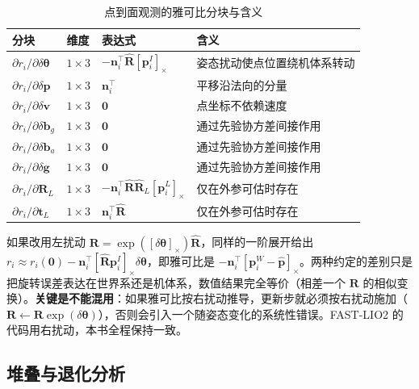 \begin{table}[htbp]
  \centering
  \caption{点到面观测的雅可比分块与含义}\label{tab:17-jacobian}
  \small
  \begin{tabular}{llll}
    \toprule
    分块 & 维度 & 表达式 & 含义 \\
    \midrule
    $\partial r_i/\partial\delta\bm{\theta}$ & $1\times3$ & $-\bm{n}_i^{\top}\hat{\bm{R}}[\bm{p}_i^{I}]_\times$ & 姿态扰动使点位置绕机体系转动 \\
    $\partial r_i/\partial\delta\bm{p}$ & $1\times3$ & $\bm{n}_i^{\top}$ & 平移沿法向的分量 \\
    $\partial r_i/\partial\delta\bm{v}$ & $1\times3$ & $\bm{0}$ & 点坐标不依赖速度 \\
    $\partial r_i/\partial\delta\bm{b}_g$ & $1\times3$ & $\bm{0}$ & 通过先验协方差间接作用 \\
    $\partial r_i/\partial\delta\bm{b}_a$ & $1\times3$ & $\bm{0}$ & 通过先验协方差间接作用 \\
    $\partial r_i/\partial\delta\bm{g}$ & $1\times3$ & $\bm{0}$ & 通过先验协方差间接作用 \\
    \midrule
    $\partial r_i/\partial\bm{R}_L$ & $1\times3$ & $-\bm{n}_i^{\top}\hat{\bm{R}}\hat{\bm{R}}_L[\bm{p}_i^{L}]_\times$ & 仅在外参可估时存在 \\
    $\partial r_i/\partial\bm{t}_L$ & $1\times3$ & $\bm{n}_i^{\top}\hat{\bm{R}}$ & 仅在外参可估时存在 \\
    \bottomrule
  \end{tabular}
\end{table}

\begin{remark}[左扰动与右扰动]
如果改用左扰动 $\bm{R}=\exp([\delta\bm{\theta}]_\times)\hat{\bm{R}}$，同样的一阶展开给出
$r_i\approx r_i(\bm{0})-\bm{n}_i^{\top}[\hat{\bm{R}}\bm{p}_i^{I}]_\times\delta\bm{\theta}$，即雅可比是 $-\bm{n}_i^{\top}[\bm{p}_i^{W}-\hat{\bm{p}}]_\times$。两种约定的差别只是把旋转误差表达在世界系还是机体系，数值结果完全等价（相差一个 $\bm{R}$ 的相似变换）。\textbf{关键是不能混用}：如果雅可比按右扰动推导，更新步就必须按右扰动施加（$\bm{R}\leftarrow\bm{R}\exp(\delta\bm{\theta})$），否则会引入一个随姿态变化的系统性错误。FAST-LIO2 的代码用右扰动，本书全程保持一致。
\end{remark}

\subsection{堆叠与退化分析}

